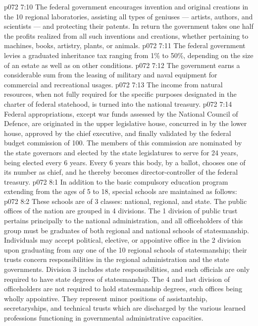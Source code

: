 \vs p072 7:10 \bibnobreakspace {} The federal government encourages invention and original creations in the 10 regional laboratories, assisting all types of geniuses --- artists, authors, and scientists --- and protecting their patents. In return the government takes one half the profits realized from all such inventions and creations, whether pertaining to machines, books, artistry, plants, or animals.
\vs p072 7:11 \bibnobreakspace {} The federal government levies a graduated inheritance tax ranging from 1\% to 50\%, depending on the size of an estate as well as on other conditions.
\vs p072 7:12 \bibnobreakspace {} The government earns a considerable sum from the leasing of military and naval equipment for commercial and recreational usages.
\vs p072 7:13 \bibnobreakspace {} The income from natural resources, when not fully required for the specific purposes designated in the charter of federal statehood, is turned into the national treasury.
\vs p072 7:14 \pc Federal appropriations, except war funds assessed by the National Council of Defence, are originated in the upper legislative house, concurred in by the lower house, approved by the chief executive, and finally validated by the federal budget commission of 100. The members of this commission are nominated by the state governors and elected by the state legislatures to serve for 24 years,  being elected every 6 years. Every 6 years this body, by a  ballot, chooses one of its number as chief, and he thereby becomes director\hyp{}controller of the federal treasury.
\vs p072 8:1 In addition to the basic compulsory education program extending from the ages of 5 to 18, special schools are maintained as follows:
\vs p072 8:2 \bibnobreakspace {} These schools are of 3 classes: national, regional, and state. The public offices of the nation are grouped in 4 divisions. The 1 division of public trust pertains principally to the national administration, and all officeholders of this group must be graduates of both regional and national schools of statesmanship. Individuals may accept political, elective, or appointive office in the 2 division upon graduating from any one of the 10 regional schools of statesmanship; their trusts concern responsibilities in the regional administration and the state governments. Division 3 includes state responsibilities, and such officials are only required to have state degrees of statesmanship. The 4 and last division of officeholders are not required to hold statesmanship degrees, such offices being wholly appointive. They represent minor positions of assistantship, secretaryships, and technical trusts which are discharged by the various learned professions functioning in governmental administrative capacities.
